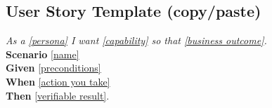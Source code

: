 \documentclass[11pt,a4paper]{article}
\begin{document}
\subsection*{User Story Template (copy/paste)}
\noindent\emph{As a \underline{[persona]} I want \underline{[capability]} so that \underline{[business outcome]}.}\\
\textbf{Scenario} \underline{[name]} \\
\textbf{Given} \underline{[preconditions]} \\
\textbf{When} \underline{[action you take]} \\
\textbf{Then} \underline{[verifiable result]}.

\clearpage

\end{document}
